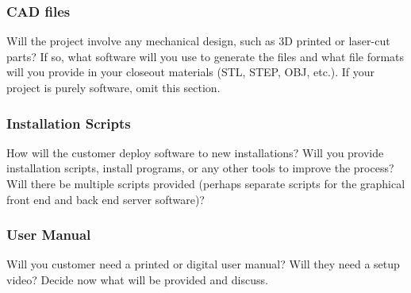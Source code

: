 \subsubsection{CAD files}
Will the project involve any mechanical design, such as 3D printed or laser-cut parts? If so, what software will you use to generate the files and what file formats will you provide in your closeout materials (STL, STEP, OBJ, etc.). If your project is purely software, omit this section.

\subsubsection{Installation Scripts}
How will the customer deploy software to new installations? Will you provide installation scripts, install programs, or any other tools to improve the process? Will there be multiple scripts provided (perhaps separate scripts for the graphical front end and back end server software)? 

\subsubsection{User Manual}
Will you customer need a printed or digital user manual? Will they need a setup video? Decide now what will be provided and discuss.
